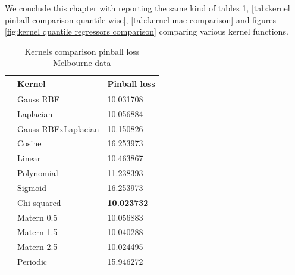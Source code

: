We conclude this chapter with reporting the same kind of tables \ref{tab:kernel pinball comparison}, \ref{tab:kernel pinball comparison quantile-wise}, \ref{tab:kernel mae comparison} and figures \ref{fig:kernel quantile regressors comparison} comparing various kernel functions.

\begin{table}[!h]
    \caption{Kernels comparison pinball loss Melbourne data}
    \label{tab:kernel pinball comparison}
    \begin{center}
    \begin{tabular}{lll}
        \toprule
        & Kernel & Pinball loss
        \\
        \midrule
        & Gauss RBF &  10.031708 \\
        & Laplacian &  10.056884 \\
        & Gauss RBFxLaplacian & 10.150826 \\
        & Cosine & 16.253973    \\
        & Linear & 10.463867    \\
        & Polynomial & 11.238393     \\
        & Sigmoid & 16.253973            \\
        & Chi squared & \textbf{10.023732}       \\
        & Matern 0.5 & 10.056883  \\
        & Matern 1.5 & 10.040288  \\
        & Matern 2.5 & 10.024495    \\
        & Periodic  & 15.946272\\
        \bottomrule
        \end{tabular}
    \end{center}
    \end{table}
    
